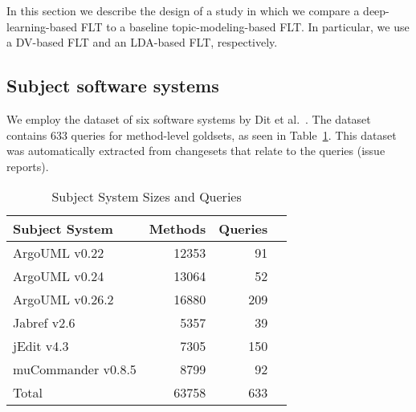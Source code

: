 
%


%


In this section we describe the design of a study in which we compare
a deep-learning-based FLT to a baseline topic-modeling-based FLT.  In
particular, we use a DV-based FLT and an LDA-based FLT, respectively.


\subsection{Subject software systems}

We employ the dataset of six software systems by Dit et
al.~\cite{Dit-etal_2013}.  The dataset contains 633 queries for method-level
goldsets, as seen in Table~\ref{table:subjects}.  This dataset was automatically
extracted from changesets that relate to the queries (issue reports).

\begin{table}[t]
\renewcommand{\arraystretch}{1.3}
\footnotesize
\centering
\caption{Subject System Sizes and Queries}
\begin{tabular}{lrrr}
    \toprule
    Subject System     & Methods & Queries    \\    %
    \midrule                                        %
    ArgoUML v0.22      & 12353    & 91        \\    %
    ArgoUML v0.24      & 13064    & 52        \\    %
    ArgoUML v0.26.2    & 16880    & 209       \\    %
    Jabref v2.6        & 5357     & 39        \\    %
    jEdit v4.3         & 7305     & 150       \\    %
    muCommander v0.8.5 & 8799     & 92        \\    %
    \midrule                                        %
    Total              & 63758    & 633       \\    %
    \bottomrule
\end{tabular}
\label{table:subjects}
\end{table}

